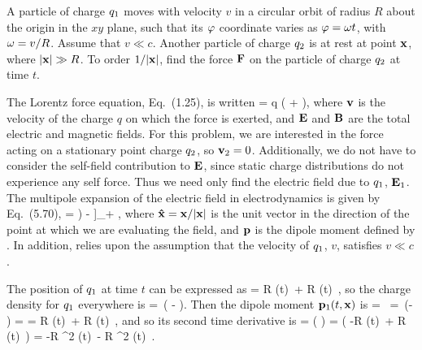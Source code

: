 \begin{statement}{}
	A particle of charge $q_1$ moves with velocity $v$ in a circular orbit of radius $R$ about the origin in the $xy$ plane, such that its $\varphi$ coordinate varies as $\varphi = \omega t$, with $\omega = v / R$.  Assume that $v \ll c$.  Another particle of charge $q_2$ is at rest at point $\vb{x}$, where $\abs{\vb{x}} \gg R$.  To order $1 / \abs{\vb{x}}$, find the force $\vb{F}$ on the particle of charge $q_2$ at time $t$.
\end{statement}

\begin{solution}
	The Lorentz force equation, Eq.~(1.25), is written
	\beqn \label{lorentz}
		\vF = q \left( \vE +  \cross \vB \right),
	\eeqn
	where $\vb{v}$ is the velocity of the charge $q$ on which the force is exerted, and $\vb{E}$ and $\vb{B}$ are the total electric and magnetic fields.  For this problem, we are interested in the force acting on a stationary point charge $q_2$, so $\vb{v}_2 = 0$.  Additionally, we do not have to consider the self-field contribution to $\vb{E}$, since static charge distributions do not experience any self force.  Thus we need only find the electric field due to $q_1$, $\vb{E}_1$.  The multipole expansion of the electric field in electrodynamics is given by Eq.~(5.70),
	\beqn \label{Efield}
		\vE\tx =  \left[ \left(\xh \vdot \dv[2]{\vp}{t} \right) \xh -  \right]_\ret + ,
	\eeqn
	where $\vb{\hat{x}} = \vb{x} / \abs{\vb{x}}$ is the unit vector in the direction of the point at which we are evaluating the field, and $\vb{p}$ is the dipole moment defined by .  In addition,  relies upon the assumption that the velocity of $q_1$, $v$, satisfies $v \ll c$.
	
	The position of $q_1$ at time $t$ can be expressed as
	\beq
		\vxqt = R \cos(\omg t) \,\xh + R \sin(\omg t) \,\yh,
	\eeq
	so the charge density for $q_1$ everywhere is
	\beq
		\rhoq\tx = \qq \,\del\big( \vx - \vxqt \big).
	\eeq
	Then the dipole moment $\vb{p}_1(t, \vb{x})$ is
	\beq
		\vpq\tx = \int \vx \,\rhoq\tx \dcx
		= \qq \int \vx \,\del\big(\vx - \vxqt \big) \dcx
		= \qq \vxqt
		= \qq R \cos(\omg t) \,\xh + \qq R \sin(\omg t) \,\yh,
	\eeq
	and so its second time derivative is
	\beq
		 =  \left(  \right)
		=  \bigg( \!-\!\qq R \omg \sin(\omg t) \,\xh + \qq R \omg \cos(\omg t) \,\yh \bigg)
		= -\qq R \omg^2 \cos(\omg t) \,\xh - \qq R \omg^2 \sin(\omg t) \,\yh.
	\eeq
	

\end{solution}
